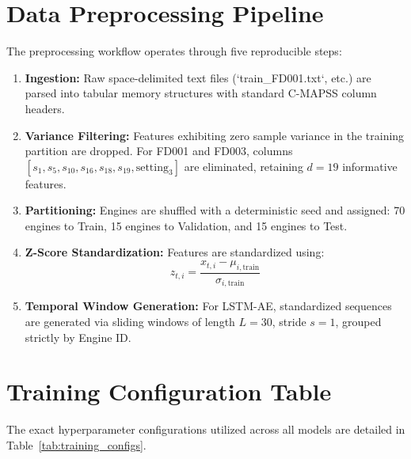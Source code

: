 \documentclass[12pt,a4paper,oneside]{report}
\begin{document}
\section{Data Preprocessing Pipeline}
The preprocessing workflow operates through five reproducible steps:
\begin{enumerate}
    \item \textbf{Ingestion:} Raw space-delimited text files (`train\_FD001.txt`, etc.) are parsed into tabular memory structures with standard C-MAPSS column headers.
    \item \textbf{Variance Filtering:} Features exhibiting zero sample variance in the training partition are dropped. For FD001 and FD003, columns $[s_1, s_5, s_{10}, s_{16}, s_{18}, s_{19}, \text{setting}_3]$ are eliminated, retaining $d = 19$ informative features.
    \item \textbf{Partitioning:} Engines are shuffled with a deterministic seed and assigned: 70 engines to Train, 15 engines to Validation, and 15 engines to Test.
    \item \textbf{Z-Score Standardization:} Features are standardized using:
    \begin{equation}
        z_{t,i} = \frac{x_{t,i} - \mu_{i,\text{train}}}{\sigma_{i,\text{train}}}
    \end{equation}
    \item \textbf{Temporal Window Generation:} For LSTM-AE, standardized sequences are generated via sliding windows of length $L = 30$, stride $s = 1$, grouped strictly by Engine ID.
\end{enumerate}

\section{Training Configuration Table}
The exact hyperparameter configurations utilized across all models are detailed in Table~\ref{tab:training_configs}.
\end{document}
